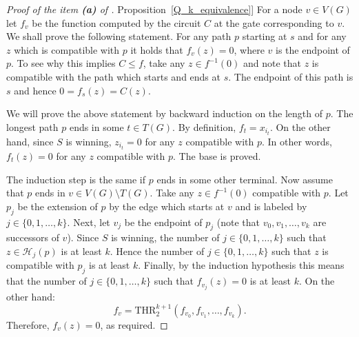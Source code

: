 \documentclass[11pt]{article}
\numberwithin{equation}{section}
\theoremstyle{definition}
\theoremstyle{plain}
\newcommand{\expref}[2]{\hyperref[#2]{#1~\ref{#2}}}
\def\THR{\mathrm{THR}}
\begin{document}
\begin{proof}[Proof of the item \textbf{(a)} of \expref{Proposition}{Q_k_equivalence}]
For a node $v \in V(G)$ let $f_v$ be the function computed by the circuit $C$ at the gate corresponding to $v$. We shall prove the following statement. For any path $p$ starting at $s$ and for any $z$ which is compatible with $p$ it holds that $f_v(z) = 0$, where $v$ is the endpoint of $p$. To see why this implies $C\le f$, take any $z\in f^{-1}(0)$ and note that $z$ is compatible with the path which starts and ends at $s$. The endpoint of this path is $s$ and hence $0 = f_s(z) = C(z)$.

We will prove the above statement by backward induction on the length of $p$. The longest path $p$ ends in some $t\in T(G)$. By definition, $f_t = x_{i_t}$. On the other hand, since $S$ is winning, $z_{i_t} = 0$ for any $z$ compatible with $p$. In other words, $f_t(z) = 0$ for any $z$ compatible with $p$. The base is proved.

The induction step is the same if $p$ ends in some other terminal. Now assume that $p$ ends in $v\in V(G)\setminus T(G)$. Take any $z\in f^{-1}(0)$ compatible with $p$. Let $p_j$ be the extension of $p$ by the edge which starts at $v$ and is labeled by $j\in\{0, 1, \ldots, k\}$. Next, let $v_j$ be the endpoint of $p_j$ (note that $v_0, v_1, \ldots, v_k$ are successors of $v$). Since $S$ is winning, the number of $j\in\{0, 1, \ldots, k\}$ such that $z\in \mathcal{H}_j(p)$ is at least $k$. Hence the number of $j\in \{0, 1, \ldots, k\}$ such that $z$ is compatible with $p_j$ is at least $k$. Finally, by the induction hypothesis this means that the number of $j\in\{0, 1, \ldots, k\}$ such that $f_{v_j}(z) = 0$ is at least $k$. On the other hand:
\[f_v = \THR^{k + 1}_2(f_{v_0}, f_{v_1}, \ldots, f_{v_k}).\]
Therefore, $f_v(z) = 0$, as required.
\end{proof}
\end{document}
